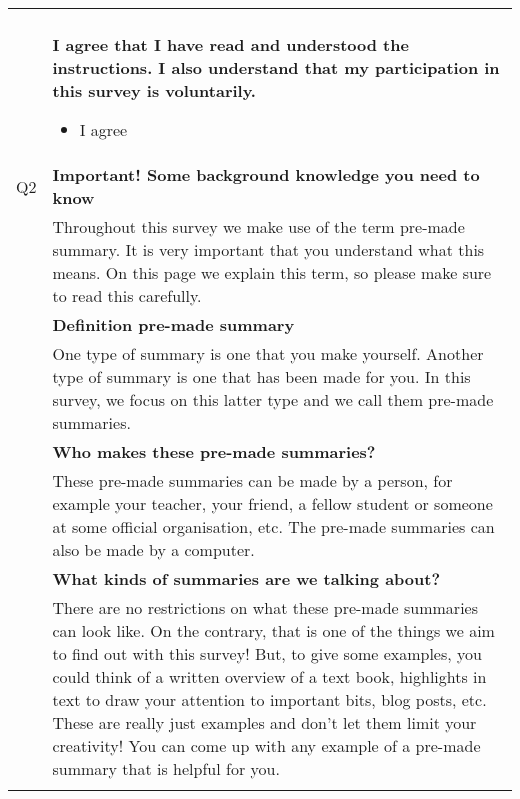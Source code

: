 \begin{xtabular}{@{\,}l <{\hskip 2pt} >{\raggedright\arraybackslash}p{0.82\textwidth}}
        & \\

        & \textbf{I agree that I have read and understood the instructions. I also understand that my participation in this survey is voluntarily.}
        \begin{itemize}[label=$\square$, leftmargin=*]
            \item I agree
        \end{itemize} \\

    Q2  & \textbf{Important! Some background knowledge you need to know} \\

        & Throughout this survey we make use of the term pre-made summary. It is very important that you understand what this means. On this page we explain this term, so please make sure to read this carefully. \\

        & \textbf{Definition pre-made summary} \\

        & One type of summary is one that you make yourself. Another type of summary is one that has been made for you. In this survey, we focus on this latter type and we call them pre-made summaries. \\

        & \textbf{Who makes these pre-made summaries?} \\

        & These pre-made summaries can be made by a person, for example your teacher, your friend, a fellow student or someone at some official organisation, etc. The pre-made summaries can also be made by a computer. \\

        & \textbf{What kinds of summaries are we talking about?} \\

        & There are no restrictions on what these pre-made summaries can look like. On the contrary, that is one of the things we aim to find out with this survey! But, to give some examples, you could think of a written overview of a text book, highlights in text to draw your attention to important bits, blog posts, etc. These are really just examples and don't let them limit your creativity! You can come up with any example of a pre-made summary that is helpful for you. \\

        & \\


\end{xtabular}
